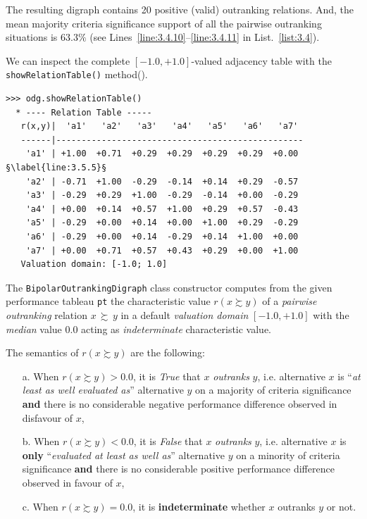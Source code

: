 The resulting digraph contains 20 positive (valid) outranking relations. And, the mean majority criteria significance support of all the pairwise outranking situations is $63.3\%$ (see Lines~\ref{line:3.4.10}--\ref{line:3.4.11} in List.~\vref{list:3.4}).

We can inspect the complete $[-1.0,+1.0]$-valued adjacency table with the \texttt{show\-RelationTable()} method().
\begin{lstlisting}[caption={Inspecting the valued adjacency table.},label=list:3.5]
>>> odg.showRelationTable()
  * ---- Relation Table -----
   r(x,y)|  'a1'   'a2'   'a3'   'a4'   'a5'   'a6'   'a7'   
   ------|-------------------------------------------------
    'a1' | +1.00  +0.71  +0.29  +0.29  +0.29  +0.29  +0.00  §\label{line:3.5.5}§
    'a2' | -0.71  +1.00  -0.29  -0.14  +0.14  +0.29  -0.57  
    'a3' | -0.29  +0.29  +1.00  -0.29  -0.14  +0.00  -0.29  
    'a4' | +0.00  +0.14  +0.57  +1.00  +0.29  +0.57  -0.43  
    'a5' | -0.29  +0.00  +0.14  +0.00  +1.00  +0.29  -0.29  
    'a6' | -0.29  +0.00  +0.14  -0.29  +0.14  +1.00  +0.00  
    'a7' | +0.00  +0.71  +0.57  +0.43  +0.29  +0.00  +1.00  
   Valuation domain: [-1.0; 1.0]
\end{lstlisting}

The \texttt{BipolarOutrankingDigraph} class constructor computes from the given performance tableau \texttt{pt} the characteristic value $r(x \succsim y)$ of a \emph{pairwise outranking} relation $x\, \succsim \,y$ in a default \emph{valuation domain} $[-1.0,+1.0]$ with the {\em median\/} value $0.0$ acting as \emph{indeterminate} characteristic value. 

The semantics of $r(x \succsim y)$ are the following:
\begin{definition}\label{def:3.1} 
\begin{itemize}[topsep=3pt]
\item [a.] When $r(x \succsim y) > 0.0$, it is \emph{True} that $x$ \emph{outranks} $y$, i.e. alternative $x$ is ``\emph{at least as well evaluated as}'' alternative $y$ on a majority of criteria significance \textbf{and} there is no considerable negative performance difference observed in disfavour of $x$,
\item [b.] When $r(x \succsim y) < 0.0$, it is \emph{False} that $x$ \emph{outranks} $y$, i.e. alternative $x$ is {\bf only} ``\emph{evaluated at least as well as}'' alternative $y$ on a minority of criteria significance \textbf{and} there is no considerable positive performance difference observed in favour of $x$,
\item [c.] When $r(x \succsim y) = 0.0$, it is {\bf indeterminate} whether $x$ outranks $y$ or not.
\end{itemize}
\end{definition}

